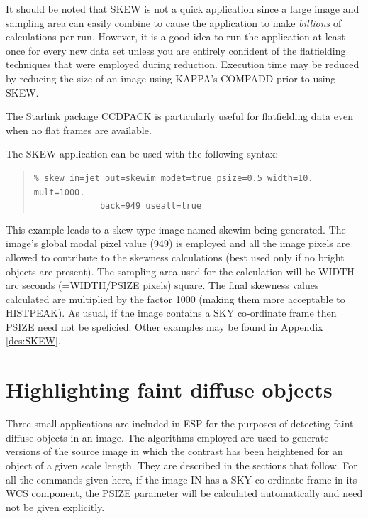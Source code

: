\documentclass[twoside,11pt]{article}
\newcommand{\xref}[3]{#1}
\newenvironment{myquote}{\begin{quote}\begin{small}}{\end{small}\end{quote}}
\begin{document}
It should be noted that SKEW is not a quick application since a large image and 
sampling area can easily combine to cause the application to make {\em billions}
of calculations per run. However, it is a good idea to run the application at 
least once for every new data set unless you are entirely confident of the 
flatfielding techniques that were employed during reduction. Execution time 
may be reduced by reducing the size of an image using \xref{KAPPA}{sun95}{}'s COMPADD prior 
to using SKEW.
                           
The Starlink package \xref{CCDPACK}{sun139}{} is particularly useful for flatfielding data 
even when no flat frames are available.

The SKEW application can be used with the following syntax:

\begin{myquote}
\begin{verbatim}
% skew in=jet out=skewim modet=true psize=0.5 width=10. mult=1000.
             back=949 useall=true 
\end{verbatim}
\end{myquote}

This example leads to a skew type image named skewim being generated. 
The image's global modal pixel value (949) is employed and all the image 
pixels are allowed to contribute to the skewness calculations (best used 
only if no bright objects are present). The sampling area used for the 
calculation will be WIDTH arc seconds (=WIDTH/PSIZE pixels) square.
The final skewness values calculated are multiplied by the factor 
1000 (making them more acceptable to HISTPEAK). 
As usual, if the image contains a SKY co-ordinate frame then PSIZE
need not be speficied.
Other examples may be 
found in Appendix \ref{des:SKEW}.

\section{Highlighting faint diffuse objects}
\label{sec:highlighting}

Three small applications are included in ESP for the purposes of detecting faint
diffuse objects in an image. The algorithms employed are used to generate 
versions of the source image in which the contrast has been heightened for
an object of a given scale length. They are described in the sections that 
follow.
For all the commands given here, if the image IN has a SKY co-ordinate
frame in its WCS component, the PSIZE parameter will be calculated
automatically and need not be given explicitly.
\end{document}
